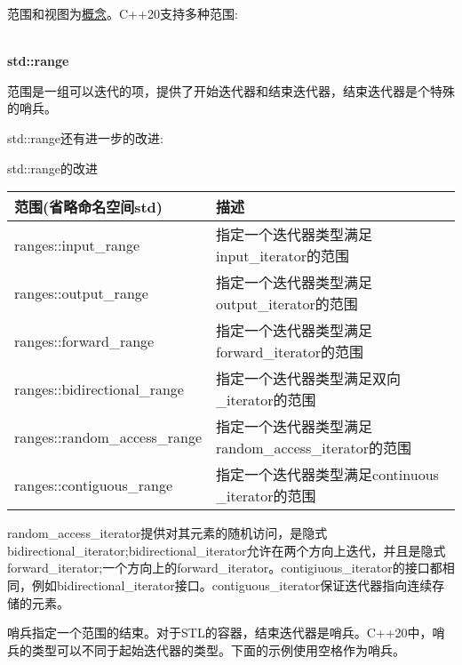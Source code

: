范围和视图为\href{https://en.cppreference.com/w/cpp/language/constraint}{概念}。C++20支持多种范围:

\hspace*{\fill} \\
\noindent
\textbf{std::range}

范围是一组可以迭代的项，提供了开始迭代器和结束迭代器，结束迭代器是个特殊的哨兵。

std::range还有进一步的改进:

\begin{center}
std::range的改进
\end{center}

\begin{longtable}[c]{|l|l|}
\hline
\textbf{范围(省略命名空间std)} & \textbf{描述}                                              \\ \hline
\endfirsthead
%
\endhead
%
ranges::input\_range                  & 指定一个迭代器类型满足input\_iterator的范围   \\ \hline
ranges::output\_range                 & 指定一个迭代器类型满足output\_iterator的范围  \\ \hline
ranges::forward\_range                & 指定一个迭代器类型满足forward\_iterator的范围 \\ \hline
ranges::bidirectional\_range  & 指定一个迭代器类型满足双向\_iterator的范围  \\ \hline
ranges::random\_access\_range & 指定一个迭代器类型满足random\_access\_iterator的范围 \\ \hline
ranges::contiguous\_range     & 指定一个迭代器类型满足continuous \_iterator的范围      \\ \hline
\end{longtable}


random\_access\_iterator提供对其元素的随机访问，是隐式bidirectional\_iterator;bidirectional\_iterator允许在两个方向上迭代，并且是隐式forward\_iterator;一个方向上的forward\_iterator。contigiuous\_iterator的接口都相同，例如bidirectional\_iterator接口。contiguous\_iterator保证迭代器指向连续存储的元素。


哨兵指定一个范围的结束。对于STL的容器，结束迭代器是哨兵。C++20中，哨兵的类型可以不同于起始迭代器的类型。下面的示例使用空格作为哨兵。

